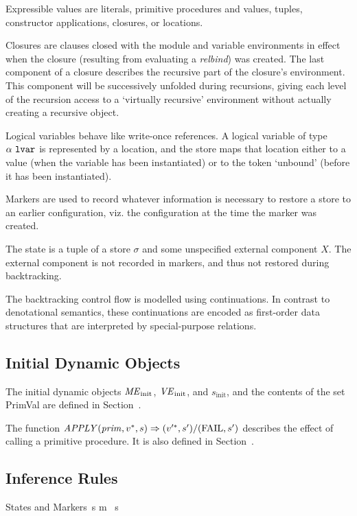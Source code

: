 Expressible values are literals, primitive procedures and values,
tuples, constructor applications, closures, or locations.

Closures are clauses closed with the module and variable environments
in effect when the closure (resulting from evaluating a \emph{relbind})
was created. The last component of a closure describes the recursive part
of the closure's environment. This component will be successively
unfolded during recursions, giving each level of the recursion
access to a `virtually recursive' environment without actually
creating a recursive object.

Logical variables behave like write-once references.
A logical variable of type $\alpha~\mbox{\texttt{lvar}}$ is represented
by a location, and the store maps that location either to
a value (when the variable has been instantiated) or to the
token `unbound' (before it has been instantiated).

Markers are used to record whatever information is necessary to
restore a store to an earlier configuration, viz. the configuration
at the time the marker was created.

The state is a tuple of a store $\sigma$ and some unspecified
external component $X$.
The external component is not recorded in markers, and thus
not restored during backtracking.

The backtracking control flow is
modelled
using continuations.
In contrast to denotational semantics, these continuations are encoded
as first-order data structures that are interpreted by special-purpose relations.
%
\subsection{Initial Dynamic Objects}
The initial dynamic objects $\mbox{\textit{ME}}_{\mathrm{init}}$, $\mbox{\textit{VE}}_{\mathrm{init}}$,
and $s_{\mathrm{init}}$, and the contents of the
set PrimVal are defined in Section~.

The function
$\mbox{\textit{APPLY}}(\mbox{\textit{prim}},v^{*},s)\Rightarrow(v'^{*},s')/(\mathrm{FAIL},s')$
describes the effect of calling a primitive procedure.
It is also defined in Section~.
%
\subsection{Inference Rules}

\begin{relation}{States and Markers}{~s \Rightarrow m}
	{~s \Rightarrow \sigma}
\end{relation}

